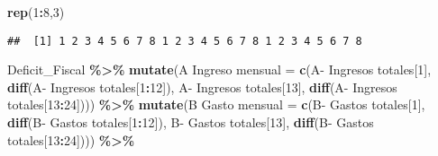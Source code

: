 \documentclass[
]{article}
\newenvironment{Shaded}{\begin{snugshade}}{\end{snugshade}}
\newcommand{\AttributeTok}[1]{\textcolor[rgb]{0.13,0.29,0.53}{#1}}
\newcommand{\DecValTok}[1]{\textcolor[rgb]{0.00,0.00,0.81}{#1}}
\newcommand{\FunctionTok}[1]{\textcolor[rgb]{0.13,0.29,0.53}{\textbf{#1}}}
\newcommand{\NormalTok}[1]{#1}
\newcommand{\OtherTok}[1]{\textcolor[rgb]{0.56,0.35,0.01}{#1}}
\newcommand{\SpecialCharTok}[1]{\textcolor[rgb]{0.81,0.36,0.00}{\textbf{#1}}}
\newcommand{\StringTok}[1]{\textcolor[rgb]{0.31,0.60,0.02}{#1}}
\begin{document}
\begin{Shaded}
\begin{Highlighting}[]
\FunctionTok{rep}\NormalTok{(}\DecValTok{1}\SpecialCharTok{:}\DecValTok{8}\NormalTok{,}\DecValTok{3}\NormalTok{)}
\end{Highlighting}
\end{Shaded}

\begin{verbatim}
##  [1] 1 2 3 4 5 6 7 8 1 2 3 4 5 6 7 8 1 2 3 4 5 6 7 8
\end{verbatim}

\begin{Shaded}
\begin{Highlighting}[]
\NormalTok{Deficit\_Fiscal }\SpecialCharTok{\%\textgreater{}\%}
  \FunctionTok{mutate}\NormalTok{(}\StringTok{\textasciigrave{}}\AttributeTok{A Ingreso mensual}\StringTok{\textasciigrave{}} \OtherTok{=} 
           \FunctionTok{c}\NormalTok{(}\StringTok{\textasciigrave{}}\AttributeTok{A{-} Ingresos totales}\StringTok{\textasciigrave{}}\NormalTok{[}\DecValTok{1}\NormalTok{],}
             \FunctionTok{diff}\NormalTok{(}\StringTok{\textasciigrave{}}\AttributeTok{A{-} Ingresos totales}\StringTok{\textasciigrave{}}\NormalTok{[}\DecValTok{1}\SpecialCharTok{:}\DecValTok{12}\NormalTok{]),}
             \StringTok{\textasciigrave{}}\AttributeTok{A{-} Ingresos totales}\StringTok{\textasciigrave{}}\NormalTok{[}\DecValTok{13}\NormalTok{],}
             \FunctionTok{diff}\NormalTok{(}\StringTok{\textasciigrave{}}\AttributeTok{A{-} Ingresos totales}\StringTok{\textasciigrave{}}\NormalTok{[}\DecValTok{13}\SpecialCharTok{:}\DecValTok{24}\NormalTok{]))) }\SpecialCharTok{\%\textgreater{}\%}
  \FunctionTok{mutate}\NormalTok{(}\StringTok{\textasciigrave{}}\AttributeTok{B Gasto mensual}\StringTok{\textasciigrave{}} \OtherTok{=} 
           \FunctionTok{c}\NormalTok{(}\StringTok{\textasciigrave{}}\AttributeTok{B{-} Gastos totales}\StringTok{\textasciigrave{}}\NormalTok{[}\DecValTok{1}\NormalTok{],}
             \FunctionTok{diff}\NormalTok{(}\StringTok{\textasciigrave{}}\AttributeTok{B{-} Gastos totales}\StringTok{\textasciigrave{}}\NormalTok{[}\DecValTok{1}\SpecialCharTok{:}\DecValTok{12}\NormalTok{]),}
             \StringTok{\textasciigrave{}}\AttributeTok{B{-} Gastos totales}\StringTok{\textasciigrave{}}\NormalTok{[}\DecValTok{13}\NormalTok{],}
             \FunctionTok{diff}\NormalTok{(}\StringTok{\textasciigrave{}}\AttributeTok{B{-} Gastos totales}\StringTok{\textasciigrave{}}\NormalTok{[}\DecValTok{13}\SpecialCharTok{:}\DecValTok{24}\NormalTok{]))) }\SpecialCharTok{\%\textgreater{}\%} 

\end{Highlighting}
\end{Shaded}
\end{document}
